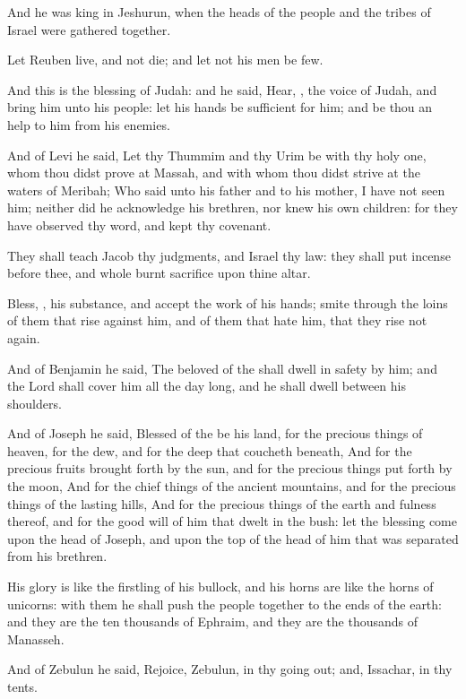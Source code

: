 \verse And he was king in Jeshurun, when the heads of the people and the tribes of Israel were gathered together.

\verse Let Reuben live, and not die; and let not his men be few.

\verse And this is the blessing of Judah: and he said, Hear, \LORD, the voice of Judah, and bring him unto his people: let his hands be sufficient for him; and be thou an help to him from his enemies.

\verse And of Levi he said, Let thy Thummim and thy Urim be with thy holy one, whom thou didst prove at Massah, and with whom thou didst strive at the waters of Meribah; \verse Who said unto his father and to his mother, I have not seen him; neither did he acknowledge his brethren, nor knew his own children: for they have observed thy word, and kept thy covenant.

\verse They shall teach Jacob thy judgments, and Israel thy law: they shall put incense before thee, and whole burnt sacrifice upon thine altar.

\verse Bless, \LORD, his substance, and accept the work of his hands; smite through the loins of them that rise against him, and of them that hate him, that they rise not again.

\verse And of Benjamin he said, The beloved of the \LORD shall dwell in safety by him; and the Lord shall cover him all the day long, and he shall dwell between his shoulders.

\verse And of Joseph he said, Blessed of the \LORD be his land, for the precious things of heaven, for the dew, and for the deep that coucheth beneath, \verse And for the precious fruits brought forth by the sun, and for the precious things put forth by the moon, \verse And for the chief things of the ancient mountains, and for the precious things of the lasting hills, \verse And for the precious things of the earth and fulness thereof, and for the good will of him that dwelt in the bush: let the blessing come upon the head of Joseph, and upon the top of the head of him that was separated from his brethren.

\verse His glory is like the firstling of his bullock, and his horns are like the horns of unicorns: with them he shall push the people together to the ends of the earth: and they are the ten thousands of Ephraim, and they are the thousands of Manasseh.

\verse And of Zebulun he said, Rejoice, Zebulun, in thy going out; and, Issachar, in thy tents.

